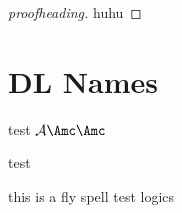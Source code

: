 \begin{proof}[proofheading]
  huhu 
\end{proof}

\section{DL Names}
\label{sec:dl-names}

\ALCALC \SHOIQSHOIQ \ALC \ALC

{\Huge \textbf{\ALCALC} test $\mathcal{A} \Amc \mathbf{\Amc}$ \textbf{\A}

\textbf{\SHOIQSHOIQ}}

test

this is a fly spell test logics 


